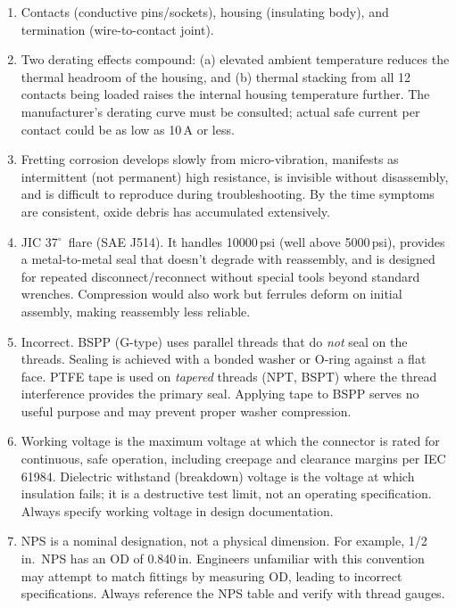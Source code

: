 \documentclass[11pt,letterpaper,twoside,openany]{book}
\begin{document}
\begin{enumerate}[leftmargin=1.5em]
  \item Contacts (conductive pins/sockets), housing (insulating body), and termination (wire-to-contact joint).

  \item Two derating effects compound: (a) elevated ambient temperature reduces the thermal headroom of the housing, and (b) thermal stacking from all 12 contacts being loaded raises the internal housing temperature further. The manufacturer's derating curve must be consulted; actual safe current per contact could be as low as 10\,A or less.

  \item Fretting corrosion develops slowly from micro-vibration, manifests as intermittent (not permanent) high resistance, is invisible without disassembly, and is difficult to reproduce during troubleshooting. By the time symptoms are consistent, oxide debris has accumulated extensively.

  \item JIC 37$^{\circ}$\ flare (SAE J514). It handles 10000\,psi (well above 5000\,psi), provides a metal-to-metal seal that doesn't degrade with reassembly, and is designed for repeated disconnect/reconnect without special tools beyond standard wrenches. Compression would also work but ferrules deform on initial assembly, making reassembly less reliable.

  \item Incorrect. BSPP (G-type) uses parallel threads that do \emph{not} seal on the threads. Sealing is achieved with a bonded washer or O-ring against a flat face. PTFE tape is used on \emph{tapered} threads (NPT, BSPT) where the thread interference provides the primary seal. Applying tape to BSPP serves no useful purpose and may prevent proper washer compression.

  \item Working voltage is the maximum voltage at which the connector is rated for continuous, safe operation, including creepage and clearance margins per IEC 61984. Dielectric withstand (breakdown) voltage is the voltage at which insulation fails; it is a destructive test limit, not an operating specification. Always specify working voltage in design documentation.

  \item NPS is a nominal designation, not a physical dimension. For example, 1/2\,in.\ NPS has an OD of 0.840\,in. Engineers unfamiliar with this convention may attempt to match fittings by measuring OD, leading to incorrect specifications. Always reference the NPS table and verify with thread gauges.


\end{enumerate}
\end{document}
